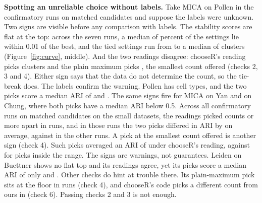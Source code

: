 \textbf{Spotting an unreliable choice without labels.} Take MICA on Pollen in the confirmatory runs on
matched candidates and suppose the labels were unknown. Two signs are visible before any comparison with labels. The stability
scores are flat at the top: across the seven runs, a median of  percent of the settings
lie within 0.01 of the best, and the tied settings run from  to a median of  clusters
(Figure~\ref{fig:curve}, middle). And the two
readings disagree: chooseR's reading picks  clusters and the plain maximum picks
, the smallest count offered (checks 2, 3 and 4). Either sign says that the data do not determine the count, so the
tie-break does. The labels confirm the warning. Pollen has  cell types, and the two
picks score a median ARI of  and . The same signs fire for MICA on
Yan and on Chung, where both picks have a median ARI below 0.5. Across all  confirmatory runs on matched candidates on the small
datasets, the readings picked counts  or more apart in  runs, and in those runs the
two picks differed in ARI by  on average, against  in the other
runs. A pick at the smallest count offered is another sign (check 4). Such picks averaged an ARI of
 under chooseR's reading, against  for picks inside the range. The
signs are warnings, not guarantees. Leiden on Buettner shows no flat top and its readings agree, yet its
picks score a median ARI of only  and . Other checks do hint at
trouble there. Its plain-maximum pick sits at the floor in  runs (check 4), and
chooseR's code picks a different count from ours in  (check 6). Passing checks 2
and 3 is not enough.

